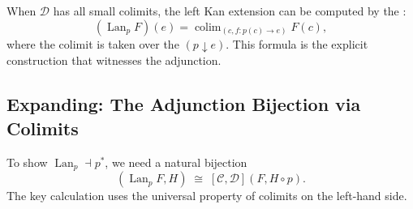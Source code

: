 When $\mathcal{D}$ has all small colimits, the left Kan extension can be computed
by the :
\begin{equation*}
  (\operatorname{Lan}_p F)(e) = \operatorname{colim}_{(c, f : p(c) \to e)} F(c),
\end{equation*}
where the colimit is taken over the  $(p \downarrow e)$.
This formula is the explicit construction that witnesses the adjunction.

\subsection{Expanding: The Adjunction Bijection via Colimits}

To show $\operatorname{Lan}_p \dashv p^*$, we need a natural bijection
\begin{equation*}
  [\mathcal{E}, \mathcal{D}](\operatorname{Lan}_p F, H) \;\cong\;
  [\mathcal{C}, \mathcal{D}](F, H \circ p).
\end{equation*}
The key calculation uses the universal property of colimits on the left-hand side.

